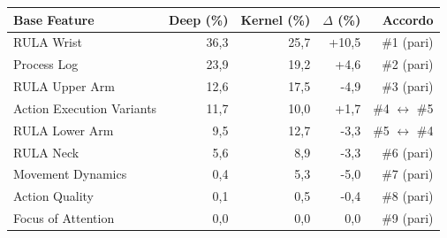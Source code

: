\begin{tabular*}{\linewidth}{@{}l@{\extracolsep{\fill}}rrrr@{}}
\toprule
\textbf{Base Feature} & \textbf{Deep (\%)} & \textbf{Kernel (\%)} & \textbf{$\Delta$ (\%)} & \textbf{Accordo} \\
\midrule
RULA Wrist & 36{,}3 & 25{,}7 & +10{,}5 & \#1 (pari) \\
Process Log & 23{,}9 & 19{,}2 & +4{,}6 & \#2 (pari) \\
RULA Upper Arm & 12{,}6 & 17{,}5 & -4{,}9 & \#3 (pari) \\
Action Execution Variants & 11{,}7 & 10{,}0 & +1{,}7 & \#4 $\leftrightarrow$ \#5 \\
RULA Lower Arm & 9{,}5 & 12{,}7 & -3{,}3 & \#5 $\leftrightarrow$ \#4 \\
RULA Neck & 5{,}6 & 8{,}9 & -3{,}3 & \#6 (pari) \\
Movement Dynamics & 0{,}4 & 5{,}3 & -5{,}0 & \#7 (pari) \\
Action Quality & 0{,}1 & 0{,}5 & -0{,}4 & \#8 (pari) \\
Focus of Attention & 0{,}0 & 0{,}0 & 0{,}0 & \#9 (pari) \\
\bottomrule
\end{tabular*}
